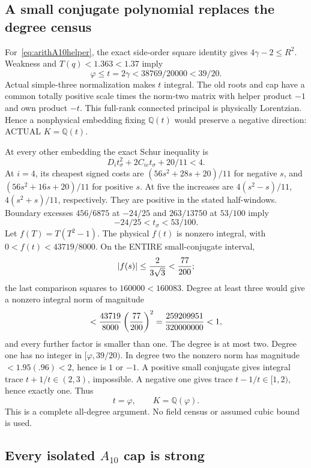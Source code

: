 \subsection{A small conjugate polynomial replaces the degree census}
\label{app:arithA10helperfield}

For~\eqref{eq:arithA10helper}, the exact
side-order square identity gives
\(4\gamma-2\le R^2\).
Weakness and \(T(q)<1.363<1.37\) imply
\[
             \varphi\le t=2\gamma
                     <38769/20000<39/20 .
\]
Actual simple-three normalization makes
\(t\) integral.
The old roots and cap have a common
totally positive scale times the norm-two
matrix with helper product \(-1\) and
own product \(-t\).
This full-rank connected principal is
physically Lorentzian.
Hence a nonphysical embedding fixing
\(\mathbb Q(t)\) would preserve a negative
direction: ACTUAL \(K=\mathbb Q(t)\).

At every other embedding the exact Schur
inequality is
\[
                  D_i t_\sigma^2+2C_{ie}t_\sigma+20/11<4 .
\]
At \(i=4\), its cheapest signed costs are
\((56s^2+28s+20)/11\) for negative \(s\),
and \((56s^2+16s+20)/11\) for positive \(s\).
At five the increases are
\(4(s^2-s)/11\), \(4(s^2+s)/11\), respectively.
They are positive in the stated half-windows.
Boundary excesses \(456/6875\) at \(-24/25\)
and \(263/13750\) at \(53/100\) imply
\[
                   -24/25<t_\sigma<53/100 .
\]
Let \(f(T)=T(T^2-1)\).
The physical \(f(t)\) is nonzero integral,
with \(0<f(t)<43719/8000\).
On the ENTIRE small-conjugate interval,
\[
 |f(s)|\le {2\over3\sqrt3}<{77\over200};
\]
the last comparison squares to
\(160000<160083\).
Degree at least three would give a nonzero
integral norm of magnitude
\[
 <{43719\over8000}\left({77\over200}\right)^2
 ={259209951\over320000000}<1 ,
\]
and every further factor is smaller than one.
The degree is at most two.
Degree one has no integer in
\([\varphi,39/20)\).
In degree two the nonzero norm has magnitude
\(<1.95(.96)<2\), hence is \(1\) or \(-1\).
A positive small conjugate gives integral
trace \(t+1/t\in(2,3)\), impossible.
A negative one gives trace
\(t-1/t\in[1,2)\), hence exactly one.
Thus
\[
                 t=\varphi,\qquad K=\mathbb Q(\varphi).
\tag{A10gold}\label{eq:arithA10gold}
\]
This is a complete all-degree argument.
No field census or assumed cubic bound is used.

\subsection{Every isolated \(A_{10}\) cap is strong}
\label{app:arithA10isolated}

